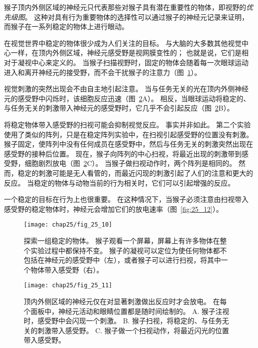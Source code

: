 \begin{proposition} \label{box:25_1}
	
	\quad \quad 猴子顶内外侧区域的神经元只代表那些对猴子具有潜在重要性的物体，即视野的\textit{优先级图}。
	这种对具有行为重要物体的选择性可以通过猴子的神经元记录来证明，而猴子在一系列稳定的物体上进行眼动。
	
	\quad \quad 在视觉世界中稳定的物体很少成为人们关注的目标。
	与大脑的大多数其他视觉中心一样，在顶内外侧区域，神经元感受野是视网膜变性的；
	也就是说，它们是相对于凝视中心来定义的。
	当猴子扫描视野时，固定的物体会随着每一次眼球运动进入和离开神经元的接受野，而不会干扰猴子的注意力（图~\ref{fig:25_10}）。
	
	\quad \quad 视觉刺激的突然出现会不由自主地引起注意。
	当与任务无关的光在顶内外侧神经元的感受野中闪烁时，该细胞反应迅速（图~\ref{fig:25_11}A）。
	相反，当眼球运动将稳定的、与任务无关的刺激带入神经元的感受野时，它几乎不会引起反应（图~\ref{fig:25_11}B）。
	
	\quad \quad 将稳定物体带入感受野的扫视可能会抑制视觉反应。
	事实并非如此。
	第二个实验使用了类似的阵列，只是在稳定阵列实验中，在扫视引起感受野的位置没有刺激。
	猴子固定，使阵列中没有任何成员在感受野中，然后与任务无关的刺激突然出现在感受野的接种后位置。
	现在，猴子向阵列的中心扫视，将最近出现的刺激带到感受野，细胞剧烈放电（图~\ref{fig:25_11}C）。
	当猴子做扫视动作时，两个阵列是相同的。
	然而，稳定的刺激可能是无人看管的，而最近闪现的刺激引起了人们的注意和更大的反应。
	当稳定的物体与动物当前的行为相关时，它们可以引起增强的反应。
	
	\quad \quad 一个稳定的目标在行为上也很重要。
	在这种情况下，当猴子必须注意由扫视带入感受野的稳定物体时，神经元会增加它们的放电速率（图~\ref{fig:25_12}）。
	
\end{proposition}


\begin{figure}[htbp]
	\centering
	\texttt{[image: chap25/fig\_25\_10]}
	\caption{探索一组稳定的物体。
		猴子观看一个屏幕，屏幕上有许多物体在整个实验过程中都保持不变。
		猴子的凝视可以定位为使任何物体都不包括在神经元的感受野中（左），或者猴子可以进行扫视，将其中一个物体带入感受野（右）。}
	\label{fig:25_10}
\end{figure}


\begin{figure}[htbp]
	\centering
	\texttt{[image: chap25/fig\_25\_11]}
	\caption{顶内外侧区域的神经元仅在对显著刺激做出反应时才会放电。
		在每个面板中，神经元活动和眼睛位置都是随时间绘制的。
		A. 猴子注视时，感受野中会闪现一个刺激。
		B. 猴子扫视，将稳定的、与任务无关的刺激带入感受野。
		C. 猴子做一个扫视动作，将最近闪光的位置带入感受野。}
	\label{fig:25_11}
\end{figure}


